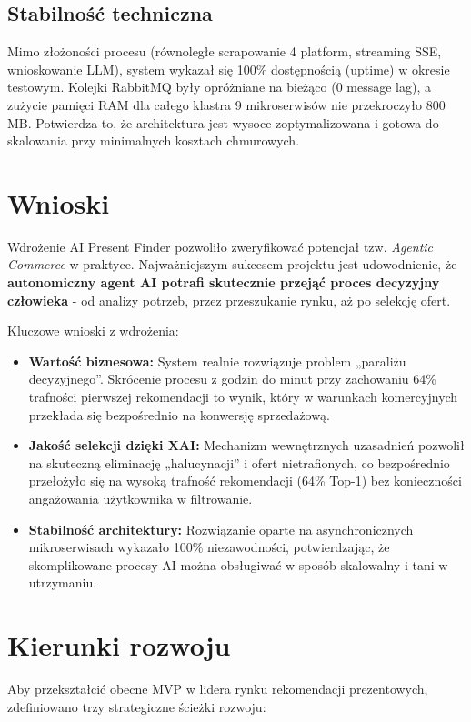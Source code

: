 \documentclass[polish,edition=2025]{zpiday}
\begin{document}
\subsection{Stabilność techniczna}

Mimo złożoności procesu (równoległe scrapowanie 4 platform, streaming SSE, wnioskowanie LLM), system wykazał się 100\% dostępnością (uptime) w okresie testowym. Kolejki RabbitMQ były opróżniane na bieżąco (0 message lag), a zużycie pamięci RAM dla całego klastra 9 mikroserwisów nie przekroczyło 800 MB. Potwierdza to, że architektura jest wysoce zoptymalizowana i gotowa do skalowania przy minimalnych kosztach chmurowych.

\section{Wnioski}

Wdrożenie AI Present Finder pozwoliło zweryfikować potencjał tzw. \textit{Agentic Commerce} w praktyce. Najważniejszym sukcesem projektu jest udowodnienie, że \textbf{autonomiczny agent AI potrafi skutecznie przejąć proces decyzyjny człowieka} - od analizy potrzeb, przez przeszukanie rynku, aż po selekcję ofert.

Kluczowe wnioski z wdrożenia:
\begin{itemize}
    \item \textbf{Wartość biznesowa:} System realnie rozwiązuje problem „paraliżu decyzyjnego”. Skrócenie procesu z godzin do minut przy zachowaniu 64\% trafności pierwszej rekomendacji to wynik, który w warunkach komercyjnych przekłada się bezpośrednio na konwersję sprzedażową.
    \item \textbf{Jakość selekcji dzięki XAI:} Mechanizm wewnętrznych uzasadnień pozwolił na skuteczną eliminację „halucynacji” i ofert nietrafionych, co bezpośrednio przełożyło się na wysoką trafność rekomendacji (64\% Top-1) bez konieczności angażowania użytkownika w filtrowanie.
    \item \textbf{Stabilność architektury:} Rozwiązanie oparte na asynchronicznych mikroserwisach wykazało 100\% niezawodności, potwierdzając, że skomplikowane procesy AI można obsługiwać w sposób skalowalny i tani w utrzymaniu.
\end{itemize}

\section{Kierunki rozwoju}

Aby przekształcić obecne MVP w lidera rynku rekomendacji prezentowych, zdefiniowano trzy strategiczne ścieżki rozwoju:
\end{document}
